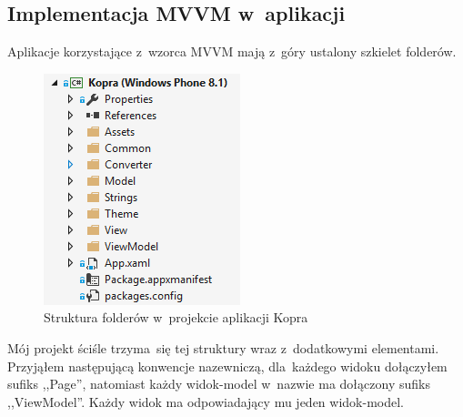 \documentclass[a4paper,twoside,titlepage,openright]{book}
\begin{document}
\subsection{Implementacja MVVM w~aplikacji}
Aplikacje korzystające z~wzorca MVVM mają z~góry ustalony szkielet folderów.

\begin{figure}[h]
	\centering
			\includegraphics[resolution=120]{strukturaFolderow.png}
		\caption{Struktura folderów w~projekcie aplikacji Kopra}
\end{figure}

Mój projekt ściśle trzyma~się tej struktury wraz z~dodatkowymi elementami. Przyjąłem następującą konwencje nazewniczą, dla~każdego widoku dołączyłem sufiks ,,Page'', natomiast każdy widok-model w~nazwie ma dołączony sufiks ,,ViewModel''. Każdy widok ma odpowiadający mu jeden widok-model. 
\end{document}

